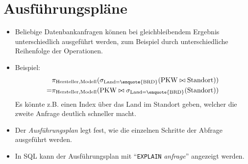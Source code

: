 	\section{Ausführungspläne} %
		\begin{itemize}
			\item Beliebige Datenbankanfragen können bei gleichbleibendem Ergebnis unterschiedlich ausgeführt werden, zum Beispiel durch unterschiedliche Reihenfolge der Operationen.
			\item Beispiel:
				\begin{align*}
					  & \pi _ { \text{Hersteller}, \text{Modell} } (\sigma _ { \text{Land} = \text{\enquote{BRD}} } (\text{PKW} \bowtie \text{Standort})) \\
					= & \pi _ { \text{Hersteller}, \text{Modell} } (\text{PKW} \bowtie \sigma _ { \text{Land} = \text{\enquote{BRD}} } (\text{Standort}))
				\end{align*}
				Es könnte z.B. einen Index über das Land im Standort geben, welcher die zweite Anfrage deutlich schneller macht.
			\item Der \textit{Ausführungsplan} legt fest, wie die einzelnen Schritte der Abfrage ausgeführt werden.
			\item In SQL kann der Ausführungsplan mit \enquote{\lstinline|EXPLAIN| \textit{anfrage}} angezeigt werden.
		\end{itemize}

